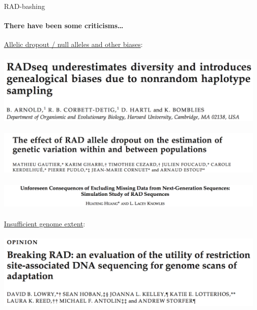 \documentclass[letter,graphicx]{beamer}
\begin{document}
\begin{frame}{RAD-bashing}
\framesubtitle{There have been some criticisms\ldots}
\underline{Allelic dropout / null alleles and other biases}:\\
~~~~~~~~~~~~~~~~~~~~~~~~~~~~~~~~~~\includegraphics[width=.55\textwidth]{./images/russ.png}\\
~~~~~~~~~~~~~\includegraphics[width=.55\textwidth]{./images/gautier.png}\\
~~~~~~~~~~~~~\includegraphics[width=.85\textwidth]{./images/huang.png}\\
\mbox{} \\
\underline{Insufficient genome extent}:\\
~~~~~~~~~~~~~\includegraphics[width=.55\textwidth]{./images/breaking.png}\\

\end{frame}
\end{document}
